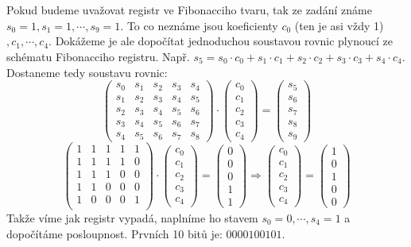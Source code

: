 \documentclass[12pt, a4paper]{article}
\begin{document}
\section{}
Pokud budeme uvažovat registr ve Fibonacciho tvaru, tak ze zadání známe $s_0 = 1, s_1 = 1, \cdots, s_9 = 1$. To co neznáme jsou koeficienty $c_0$ (ten je asi vždy 1) $, c_1, \cdots, c_4$. Dokážeme je ale dopočítat jednoduchou soustavou rovnic plynoucí ze schématu Fibonacciho registru. Např. $s_5 = s_0 \cdot c_0 + s_1 \cdot c_1 + s_2 \cdot c_2 + s_3 \cdot c_3 + s_4 \cdot c_4$. Dostaneme tedy soustavu rovnic:
$$
\begin{pmatrix}
s_0 & s_1 & s_2 & s_3 & s_4\\
s_1 & s_2 & s_3 & s_4 & s_5\\
s_2 & s_3 & s_4 & s_5 & s_6\\
s_3 & s_4 & s_5 & s_6 & s_7\\
s_4 & s_5 & s_6 & s_7 & s_8
\end{pmatrix}
\cdot
\begin{pmatrix}
c_0\\
c_1\\
c_2\\
c_3\\
c_4
\end{pmatrix}
=
\begin{pmatrix}
s_5\\
s_6\\
s_7\\
s_8\\
s_9
\end{pmatrix}
$$
$$
\begin{pmatrix}
1 & 1 & 1 & 1 & 1\\
1 & 1 & 1 & 1 & 0\\
1 & 1 & 1 & 0 & 0\\
1 & 1 & 0 & 0 & 0\\
1 & 0 & 0 & 0 & 1\\
\end{pmatrix}
\cdot
\begin{pmatrix}
c_0\\
c_1\\
c_2\\
c_3\\
c_4
\end{pmatrix}
=
\begin{pmatrix}
0\\
0\\
0\\
1\\
1
\end{pmatrix}
\Rightarrow
\begin{pmatrix}
c_0\\
c_1\\
c_2\\
c_3\\
c_4
\end{pmatrix} = \begin{pmatrix}
1\\
0\\
1\\
0\\
0
\end{pmatrix}
$$
Takže víme jak registr vypadá, naplníme ho stavem $s_0=0, \cdots, s_4=1$ a dopočítáme posloupnost. Prvních 10 bitů je: $0000100101$.
\end{document}
